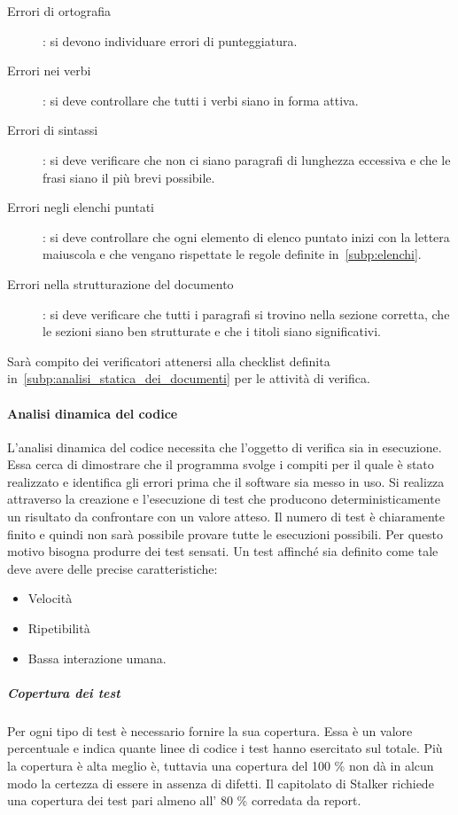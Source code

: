 \documentclass[../norme-di-progetto.tex]{subfiles}
\begin{document}
\begin{description}
  \item [Errori di ortografia]: si devono individuare errori di punteggiatura.
  \item [Errori nei verbi]: si deve controllare che tutti i verbi siano in forma attiva.
  \item [Errori di sintassi]: si deve verificare che non ci siano paragrafi di lunghezza eccessiva e che le frasi siano il più brevi possibile.
  \item [Errori negli elenchi puntati]: si deve controllare che ogni elemento di elenco puntato inizi con la lettera maiuscola e che vengano rispettate le regole definite in~\ref{subp:elenchi}.
  \item [Errori nella strutturazione del documento]: si deve verificare che tutti i paragrafi si trovino nella sezione corretta, che le sezioni siano ben strutturate e che i titoli siano significativi.
\end{description}

Sarà compito dei verificatori attenersi alla checklist definita in~\ref{subp:analisi_statica_dei_documenti} per le attività di verifica.

\paragraph{Analisi dinamica del codice}%
\label{par:analisi_dinamica_del_codice}
L'analisi dinamica del codice necessita che l'oggetto di verifica sia in esecuzione.
Essa cerca di dimostrare che il programma svolge i compiti per il quale è stato realizzato e identifica gli errori prima che il software sia messo in uso.
Si realizza attraverso la creazione e l'esecuzione di test che producono deterministicamente un risultato da confrontare con un valore atteso.
Il numero di test è chiaramente finito e quindi non sarà possibile provare tutte le esecuzioni possibili.
Per questo motivo bisogna produrre dei test sensati.
Un test affinché sia definito come tale deve avere delle precise caratteristiche:

\begin{itemize}
  \item Velocità
  \item Ripetibilità
  \item Bassa interazione umana.
\end{itemize}

\subparagraph{Copertura dei test}%
\label{subp:copertura_dei_test}
Per ogni tipo di test è necessario fornire la sua copertura.
Essa è un valore percentuale e indica quante linee di codice i test hanno esercitato sul totale.
Più la copertura è alta meglio è, tuttavia una copertura del 100 \% non dà in alcun modo la certezza di essere in assenza di difetti.
Il capitolato di Stalker richiede una copertura dei test pari almeno all' 80 \% corredata da report.
\end{document}
